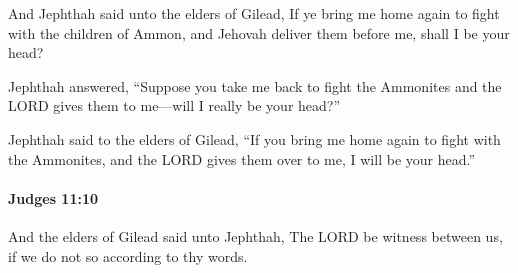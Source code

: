 			\begin{versebox}
					\item[BHS] 
					\item[ASV] And Jephthah said unto the elders of Gilead, If ye bring me home again to fight with the children of Ammon, and Jehovah deliver them before me, shall I be your head?
					\item[NIV] Jephthah answered, “Suppose you take me back to fight the Ammonites and the LORD gives them to me—will I really be your head?”
					\item[NRSV] Jephthah said to the elders of Gilead, “If you bring me home again to fight with the Ammonites, and the LORD gives them over to me, I will be your head.”
			\end{versebox}

		\paragraph{Judges 11:10} %
			\label{JUDGES-11-10}

			And the elders of Gilead said unto Jephthah, The LORD be witness between us, if we do not so according to thy words.

